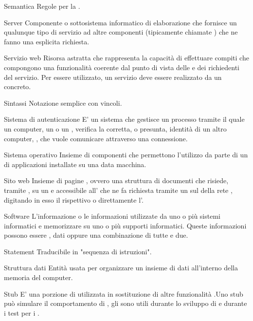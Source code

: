 \elemento
{Semantica}
{Regole per la .}

\elemento
{Server}
{Componente o sottosistema informatico di elaborazione che fornisce un qualunque tipo di servizio ad altre componenti (tipicamente chiamate ) che ne fanno una esplicita richiesta.}

\elemento
{Servizio web}
{Risorsa astratta che rappresenta la capacità di effettuare compiti che compongono una funzionalità coerente dal punto di vista delle  e dei richiedenti del servizio. Per essere utilizzato, un servizio deve essere realizzato da un  concreto.}

\elemento
{Sintassi}
{Notazione semplice con vincoli.}

\elemento
{Sistema di autenticazione}
{E' un sistema che gestisce un processo tramite il quale un computer, un  o un , verifica la corretta, o presunta, identità di un altro computer, , che vuole comunicare attraverso una connessione.}

\elemento
{Sistema operativo}
{Insieme di componenti  che permettono l'utilizzo da parte di un  di applicazioni installate su una data macchina.}

\elemento
{Sito web}
{Insieme di pagine , ovvero una struttura  di documenti che risiede, tramite , su un  e accessibile all' che ne fa richiesta tramite un  sul  della rete , digitando in esso il rispettivo  o direttamente l'.}

\elemento
{Software}
{L'informazione o le informazioni utilizzate da uno o più sistemi informatici e memorizzare su uno o più supporti informatici. Queste informazioni possono essere , dati oppure una combinazione di tutte e due.}

\elemento
{Statement}
{Traducibile in "sequenza di istruzioni".}

\elemento
{Struttura dati}
{Entità usata per organizzare un insieme di dati all'interno della memoria del computer.}

\elemento
{Stub}
{E' una porzione di  utilizzata in sostituzione di altre funzionalità .Uno stub può simulare il comportamento di , gli  sono utili durante lo sviluppo di  e durante i test per i .}

